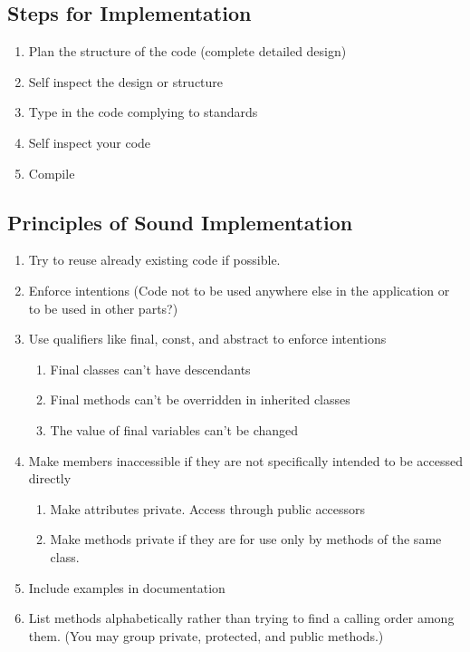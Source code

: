 \documentclass{report}
\begin{document}
			\subsection{Steps for Implementation}
				\begin{enumerate}
					\item Plan the structure of the code (complete detailed design)
					\item Self inspect the design or structure
					\item Type in the code complying to standards
					\item Self inspect your code
					\item Compile
				\end{enumerate}
			\subsection{Principles of Sound Implementation}
				\begin{enumerate}
					\item Try to reuse already existing code if possible.
					\item Enforce intentions (Code not to be used anywhere else in the application or to be used in other parts?)
					\item Use qualifiers like final, const, and abstract to enforce intentions
						\begin{enumerate}
							\item Final classes can't have descendants
							\item Final methods can't be overridden in inherited classes
							\item The value of final variables can't be changed
						\end{enumerate}
					\item Make members inaccessible if they are not specifically intended to be accessed directly
						\begin{enumerate}
							\item Make attributes private. Access through public accessors
							\item Make methods private if they are for use only by methods of the same class.
						\end{enumerate}
					\item Include examples in documentation
					\item List methods alphabetically rather than trying to find a calling order among them. (You may group private, protected, and public methods.)
				\end{enumerate}
\end{document}
